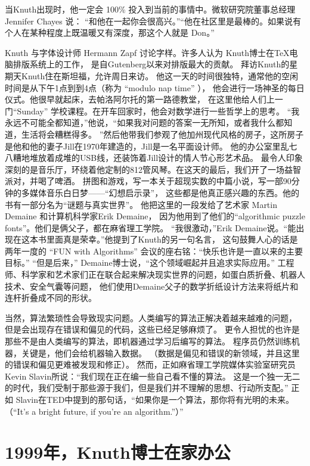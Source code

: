 \documentclass[12pt]{ctexart}
\begin{document}
\begin{multicols}{2}
当Knuth出现时，他一定会 100\% 投入到当前的事情中。微软研究院董事总经理Jennifer Chayes 说：
“和他在一起你会很高兴。”“他在社区里是最棒的。如果说有个人在某种程度上既温暖又有深度，那这个人就是 Don。”       

Knuth 与字体设计师 Hermann Zapf 讨论字样。许多人认为 Knuth博士在\TeX 电脑排版系统上的工作，
是自Gutenberg以来对排版最大的贡献。
拜访Knuth的星期天Knuth住在斯坦福，允许周日来访。
他这一天的时间很独特，通常他的空闲时间是从下午1点到到4点（称为 “modulo nap time” ），
他会进行一场神圣的每日仪式。他很早就起床，去帕洛阿尔托的第一路德教堂，
在这里他给人们上一门“Sunday” 学校课程。在开车回家时，他会对数学进行一些哲学上的思考。
“我永远不可能全都知道，”他说，“如果我对问题的答案一无所知，或者我什么都知道，生活将会糟糕得多。
”然后他带我们参观了他加州现代风格的房子，这所房子是他和他的妻子Jill在1970年建造的，Jill是一名平面设计师。
他的办公室里乱七八糟地堆放着成堆的USB线，还装饰着Jill设计的情人节心形艺术品。
最令人印象深刻的是音乐厅，环绕着他定制的812管风琴。在这天的最后，我们开了一场益智派对，并喝了啤酒。  
拼图和游戏，写一本关于超现实数的中篇小说，写一部90分钟的多媒体音乐白日梦——“幻想启示录”，
这些都是他真正感兴趣的东西。他的书有一部分名为“谜题与真实世界”。
他把这里的一段发给了艺术家 Martin Demaine 和计算机科学家Erik Demaine，
因为他用到了他们的“algorithmic puzzle fonts”。他们是俩父子，都在麻省理工学院。
“我很激动，”Erik Demaine说。“能出现在这本书里面真是荣幸。”他提到了Knuth的另一句名言，
这句鼓舞人心的话是两年一度的 “FUN with Algorithms” 会议的座右铭：“快乐也许是一直以来的主要目标。”      
“但是后来，” Demaine博士说，“这个领域崛起并且追求实际应用。”
工程师、科学家和艺术家们正在联合起来解决现实世界的问题，如蛋白质折叠、机器人技术、安全气囊等问题，
他们使用Demaine父子的数学折纸设计方法来将纸片和连杆折叠成不同的形状。

当然，算法繁琐性会导致现实问题。人类编写的算法正解决着越来越难的问题，
但是会出现存在错误和偏见的代码，这些已经足够麻烦了。
更令人担忧的也许是那些不是由人类编写的算法，即机器通过学习后编写的算法。
程序员仍然训练机器，关键是，他们会给机器输入数据。
（数据是偏见和错误的新领域，并且这里的错误和偏见更难被发现和修正）。
然而，正如麻省理工学院媒体实验室研究员Kevin Slavin所说：“我们现在正在编一些自己看不懂的算法。
这是一个独一无二的时代，我们受制于那些源于我们，但是我们并不理解的思想、行动所支配。”
正如 Slavin在TED中提到的那句话，“如果你是一个算法，那你将有光明的未来。
（“It’s a bright future, if you’re an algorithm.”）”       

\section{1999年，Knuth博士在家办公}



\end{multicols}
\end{document}

